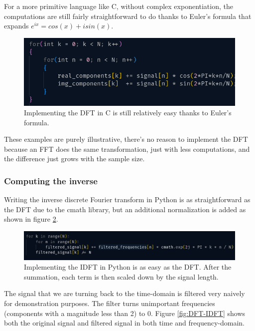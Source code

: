 For a more primitive language like C, without complex exponentiation, the computations are still fairly straightforward to do thanks to Euler's formula that expands $e^{ix} = cos(x) + isin(x)$.  

\begin{figure}[ht]
    \centering
    \includegraphics[width=\textwidth]{./images/cDFT.png}
    \caption{Implementing the DFT in C is still relatively easy thanks to Euler's formula. \label{fig:cDFT}}
\end{figure}

These examples are purely illustrative, there's no reason to implement the DFT because an FFT does the same transformation, just with less computations, and the difference just grows with the sample size.
\subsubsection{Computing the inverse}
Writing the inverse discrete Fourier transform in Python is as straightforward as the DFT due to the cmath library, but an additional normalization is added as shown in figure \ref{fig:IDFT}. 

\begin{figure}[ht]
    \centering
    \includegraphics[width=\textwidth]{./images/IDFT.png}
    \caption{Implementing the IDFT in Python is as easy as the DFT. After the summation, each term is then scaled down by the signal length. \label{fig:IDFT}}
\end{figure}

The signal that we are turning back to the time-domain is filtered very naively for demonstration purposes. The filter turns unimportant frequencies (components with a magnitude less than 2) to 0. Figure \ref{fig:DFT-IDFT} shows both the original signal and filtered signal in both time and frequency-domain.


